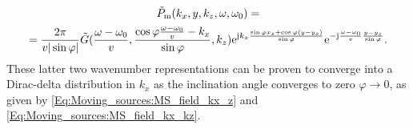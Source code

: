 \begin{multline}
\tilde{P}_{\mathrm{m}}(k_x,y,k_z,\omega,\omega_0) = \\ =
\frac{2\pi}{v|\sin\varphi|} \tilde{G}( \frac{\omega-\omega_0}{v}, \frac{\cos\varphi \frac{\omega-\omega_0}{v}- k_x }{\sin\varphi} , k_z )  
\mathrm{e}^{\mathrm{j} k_x\frac{\sin\varphi x_s + \cos\varphi (y-y_s)}{\sin\varphi}}
\mathrm{e}^{-\mathrm{j} \frac{\omega-\omega_0}{v} \frac{y-y_s}{\sin\varphi}}.
\end{multline}
These latter two wavenumber representations can be proven to converge into a Dirac-delta distribution in $k_x$ as the inclination angle converges to zero $\varphi \rightarrow 0$, as given by \eqref{Eq:Moving_sources:MS_field_kx_z} and \eqref{Eq:Moving_sources:MS_field_kx_kz}.